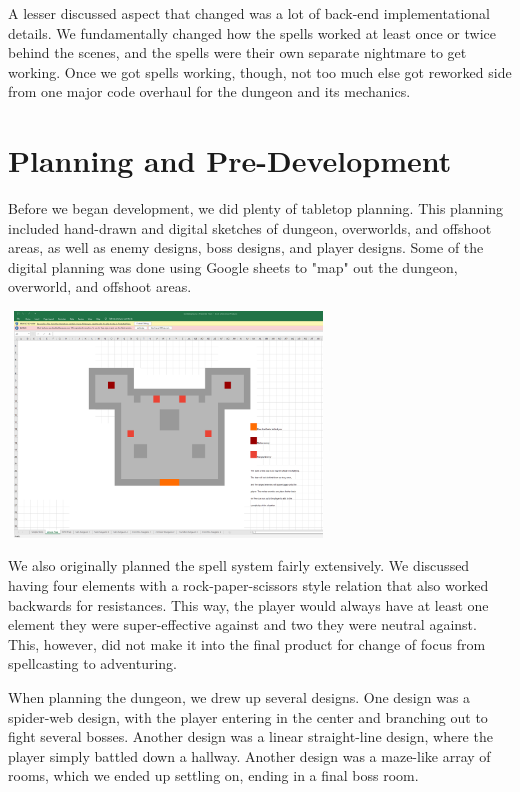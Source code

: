 \documentclass{sigchi}
\begin{document}
A lesser discussed aspect that changed was a lot of back-end implementational details.  We fundamentally changed how the spells worked at least once or twice behind the scenes, and the 
spells were their own separate nightmare to get working.  Once we got spells working, though, not too much else got reworked side from one major code overhaul for the dungeon and its mechanics.
\newpage

\section{Planning and Pre-Development}
Before we began development, we did plenty of tabletop planning.  This planning included hand-drawn and digital sketches of dungeon, overworlds, and offshoot areas, as well as enemy designs, boss designs, and player designs.  Some of the digital planning was done using Google sheets to "map" out the dungeon, overworld, and offshoot areas.

\includegraphics*[width=8.5cm, height=6cm]{./figures/designexample.png}

We also originally planned the spell system fairly extensively.  We discussed having four elements with a rock-paper-scissors style relation that also worked backwards for resistances.  This way, the player would always have at least one element they were super-effective against and two they were neutral against.  This, however, did not make it into the final product for change of focus from spellcasting to adventuring.

When planning the dungeon, we drew up several designs.  One design was a spider-web design, with the player entering in the center and branching out to fight several bosses.  Another design was a linear straight-line design, where the player simply battled down a hallway.  Another design was a maze-like array of rooms, which we ended up settling on, ending in a final boss room.
\end{document}

